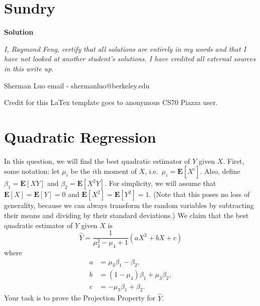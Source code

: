 \documentclass[11pt]{article}
\newcommand*{\Question}[1]{\section{#1}}
\newcommand*{\E}{\textbf{E}}
\begin{document}
\Question{Sundry} 
\vspace{10pt}
\begin{mdframed} \textbf{Solution} 
\item \textit {I, Raymond Feng, certify that all solutions are entirely in my words and that I have not looked at another student's solutions. I have credited all external sources in this write up.}
\item Sherman Luo email - shermanluo@berkeley.edu
\item Credit for this LaTex template goes to anonymous CS70 Piazza user.
\end{mdframed}
\vfill\pagebreak[3]

\Question{Quadratic Regression}

In this question, we will find the best quadratic estimator of $Y$ given $X$. First, some notation: let $\mu_i$ be the $i$th moment of $X$, i.e.\ $\mu_i = \E[X^i]$. Also, define $\beta_1 = \E[XY]$ and $\beta_2 = \E[X^2 Y]$. For simplicity, we will assume that $\E[X] = \E[Y] = 0$ and $\E[X^2] = \E[Y^2] = 1$. (Note that this poses no loss of generality, because we can always transform the random variables by subtracting their means and dividing by their standard deviations.) We claim that the best quadratic estimator of $Y$ given $X$ is
\[
  \hat{Y} = \frac{1}{\mu_3^2 - \mu_4 + 1} (a X^2 + b X + c)
\]
where
\begin{align*}
  a &= \mu_3 \beta_1 - \beta_2, \\
  b &= (1 - \mu_4) \beta_1 + \mu_3 \beta_2, \\
  c &= -\mu_3 \beta_1 + \beta_2.
\end{align*}
Your task is to prove the Projection Property for $\hat{Y}$.
\end{document}
